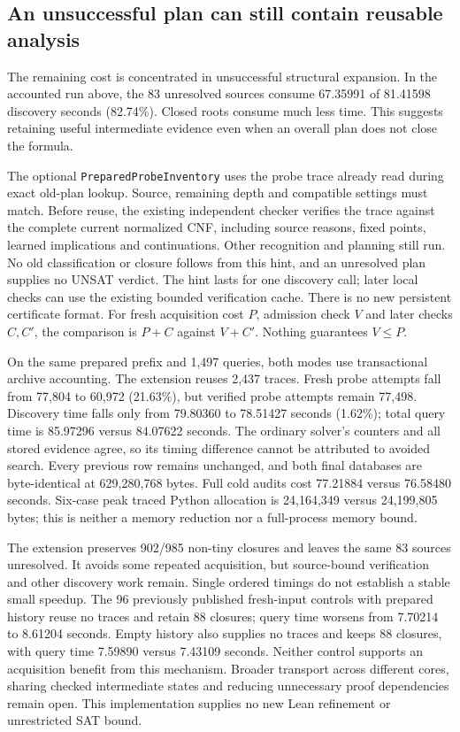\documentclass[11pt,a4paper]{article}
\numberwithin{equation}{section}
\theoremstyle{plain}
\theoremstyle{definition}
\theoremstyle{remark}
\begin{document}
\subsection{An unsuccessful plan can still contain reusable analysis}
\label{sec:prepared-probes}

The remaining cost is concentrated in unsuccessful structural expansion. In the accounted run above, the 83 unresolved sources consume 67.35991 of 81.41598 discovery seconds (82.74\%). Closed roots consume much less time. This suggests retaining useful intermediate evidence even when an overall plan does not close the formula.

The optional \texttt{PreparedProbeInventory} uses the probe trace already read during exact old-plan lookup. Source, remaining depth and compatible settings must match. Before reuse, the existing independent checker verifies the trace against the complete current normalized CNF, including source reasons, fixed points, learned implications and continuations. Other recognition and planning still run. No old classification or closure follows from this hint, and an unresolved plan supplies no UNSAT verdict. The hint lasts for one discovery call; later local checks can use the existing bounded verification cache. There is no new persistent certificate format. For fresh acquisition cost $P$, admission check $V$ and later checks $C,C'$, the comparison is $P+C$ against $V+C'$. Nothing guarantees $V\leq P$.

On the same prepared prefix and 1,497 queries, both modes use transactional archive accounting. The extension reuses 2,437 traces. Fresh probe attempts fall from 77,804 to 60,972 (21.63\%), but verified probe attempts remain 77,498. Discovery time falls only from 79.80360 to 78.51427 seconds (1.62\%); total query time is 85.97296 versus 84.07622 seconds. The ordinary solver's counters and all stored evidence agree, so its timing difference cannot be attributed to avoided search. Every previous row remains unchanged, and both final databases are byte-identical at 629,280,768 bytes. Full cold audits cost 77.21884 versus 76.58480 seconds. Six-case peak traced Python allocation is 24,164,349 versus 24,199,805 bytes; this is neither a memory reduction nor a full-process memory bound.

The extension preserves 902/985 non-tiny closures and leaves the same 83 sources unresolved. It avoids some repeated acquisition, but source-bound verification and other discovery work remain. Single ordered timings do not establish a stable small speedup. The 96 previously published fresh-input controls with prepared history reuse no traces and retain 88 closures; query time worsens from 7.70214 to 8.61204 seconds. Empty history also supplies no traces and keeps 88 closures, with query time 7.59890 versus 7.43109 seconds. Neither control supports an acquisition benefit from this mechanism. Broader transport across different cores, sharing checked intermediate states and reducing unnecessary proof dependencies remain open. This implementation supplies no new Lean refinement or unrestricted SAT bound.
\end{document}
